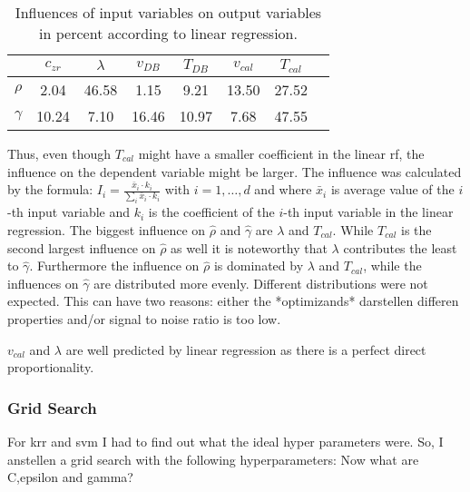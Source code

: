 %
\begin{table}[htb]
	\center
	\begin{tabular}{cccccccc}
		        & $c_{zr}$      & $\lambda$     & $v_{DB}$      & $T_{DB}$      & $v_{cal}$     & $T_{cal}$\\
				\hline\hline
				$\rho$          &2.04   &46.58  &1.15   &9.21   &13.50  &27.52\\
				$\gamma$        &10.24  &7.10   &16.46  &10.97  &7.68   &47.55\\
				\hline\hline
	\end{tabular}
	\label{tab:lin-reg-influence}
	\caption{Influences of input variables on output variables in percent according to linear regression.}
\end{table}
%
Thus, even though $T_{cal}$ might have a smaller coefficient in the linear \gls{rf}, the influence on the dependent variable might be larger. 
The influence was calculated by the formula: $I_i=\frac{\bar{x}_i \cdot k_i}{\sum_i \bar{x}_i \cdot k_i}$ with $i=1,\dots,d $ and where $\bar{x}_i$ is average value of the $i$-th input variable and $k_i$ is the coefficient of the $i$-th input variable in the linear regression. 
The biggest influence on $\hat\rho$ and $\hat\gamma$ are $\lambda$ and $T_{cal}$. 
While $T_{cal}$ is the second largest influence on $\hat\rho$ as well it is noteworthy that $\lambda$ contributes the least to $\hat\gamma$. 
Furthermore the influence on $\hat\rho$ is dominated by $\lambda$ and $T_{cal}$, while the influences on $\hat\gamma$ are distributed more evenly.
Different distributions were not expected. 
This can have two reasons: 
either the *optimizands* darstellen differen properties and/or signal to noise ratio is too low.
%

$v_{cal}$ and $\lambda$ are well predicted by linear regression as there is a perfect direct proportionality. 
%


\subsubsection{Grid Search}
For \gls{krr} and {svm} I had to find out what the ideal hyper parameters were. 
So, I anstellen a grid search with the following hyperparameters: 
Now what are C,epsilon and gamma? 

